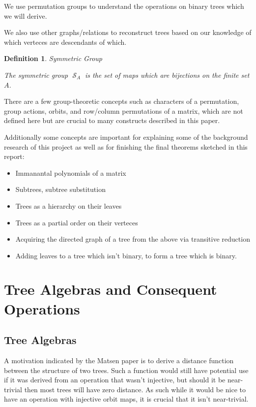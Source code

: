 \documentclass[10pt,a4paper]{report}
\DeclareMathOperator{\S}{\mathcal{S}}
\newtheorem{definition}{Definition}
\begin{document}
We use permutation groups to understand the operations on binary trees which we will derive.

We also use other graphs/relations to reconstruct trees based on our knowledge of which verteces are descendants of which.

\begin{definition} Symmetric Group

	The symmetric group $\S_A$ is the set of maps which are bijections on the finite set $A$.
\end{definition}

There are a few group-theoretic concepts such as characters of a permutation, group actions, orbits, and row/column permutations of a matrix, which are not defined here but are crucial to many constructs described in this paper.

Additionally some concepts are important for explaining some of the background research of this project as well as for finishing the final theorems sketched in this report:
\begin{itemize}
	\item Immanantal polynomials of a matrix
	\item Subtrees, subtree substitution
	\item Trees as a hierarchy on their leaves
	\item Trees as a partial order on their verteces
	\item Acquiring the directed graph of a tree from the above via transitive reduction
	\item Adding leaves to a tree which isn't binary, to form a tree which is binary.
\end{itemize}

\chapter{Tree Algebras and Consequent Operations}

\section{Tree Algebras}

A motivation indicated by the Matsen paper is to derive a distance function between
the structure of two trees.
Such a function would still have potential use if it was derived from an operation that wasn't injective, but should it be near-trivial then most trees will have zero distance.
As such while it would be nice to have an operation with injective orbit maps, it is crucial that it isn't near-trivial.
\end{document}
